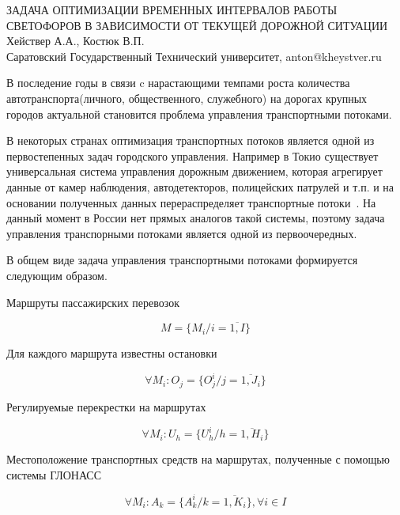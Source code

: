 \documentclass[a4paper,13pt]{article}
\begin{document}
\begin{center} %
    \large ЗАДАЧА ОПТИМИЗАЦИИ ВРЕМЕННЫХ ИНТЕРВАЛОВ РАБОТЫ СВЕТОФОРОВ В ЗАВИСИМОСТИ ОТ ТЕКУЩЕЙ ДОРОЖНОЙ СИТУАЦИИ\\
    \large Хействер А.А., Костюк В.П.\\
    \large Саратовский Государственный Технический университет, anton@kheystver.ru
\end{center} %
\thispagestyle{empty} %
В последение годы в связи c нарастающими темпами роста количества автотранспорта(личного, общественного, служебного) на дорогах крупных городов актуальной становится проблема управления транспортными потоками. 

В некоторых странах оптимизация транспортных потоков является одной из первостепенных задач городского управления. Например в Токио существует универсальная система управления дорожным движением, которая агрегирует данные от камер наблюдения, автодетекторов, полицейских патрулей и т.п. и на основании полученных данных перераспределяет транспортные потоки~\cite{pa}. На данный момент в России нет прямых аналогов такой системы, поэтому задача управления транспорными потоками является одной из первоочередных.

В общем виде задача управления транспортными потоками формируется следующим образом.

Маршруты пассажирских перевозок

\begin{equation}\label{eq:marshruts}
M = \{ M_i/i= \overline{1,I} \}
\end{equation}

Для каждого маршрута известны остановки

\begin{equation}\label{eq:stops}
\forall M_i :O_j = \{ O^i_{j}/j = \overline{1,J_i} \}
\end{equation}

Регулируемые перекрестки на маршрутах

\begin{equation}\label{eq:crosses}
\forall M_i :U_h = \{ U^i_{h}/h = \overline{1,H_i} \}
\end{equation}

Местоположение транспортных средств на маршрутах, полученные с помощью системы ГЛОНАСС

\begin{equation}\label{eq:objects}
\forall M_i :A_k = \{ A^i_{k}/k = \overline{1,K_i} \}, \forall{i} \in I
\end{equation}
\end{document}
